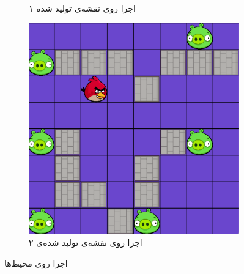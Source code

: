 \documentclass[11pt, a4paper, oneside]{article}
\begin{document}
\begin{figure}
\begin{subfigure}{0.5\textwidth}
		\caption{اجرا روی نقشه‌ی تولید شده ۱}
		\label{fig:map1}
	\end{subfigure}
\medskip
	\begin{subfigure}{0.5\textwidth}
		\includegraphics[width=\textwidth]{./images/map2}
		\caption{اجرا روی نقشه‌ی تولید شده‌ی ۲}
		\label{fig:map2}
	\end{subfigure}
	\caption{اجرا روی محیط‌ها}
	\label{Grids}
\end{figure}
\end{document}
